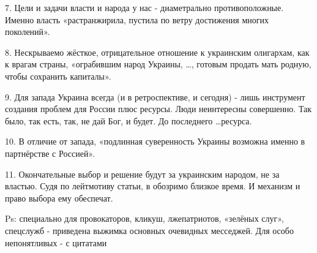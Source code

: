 7. Цели и задачи власти и народа у нас - диаметрально противоположные. Именно
власть «растранжирила, пустила по ветру достижения многих поколений».

8. Нескрываемо жёсткое, отрицательное отношение к украинским олигархам, как к
врагам страны, «ограбившим народ Украины, …, готовым продать мать родную, чтобы
сохранить капиталы». 

9. Для запада Украина всегда (и в ретроспективе, и сегодня) - лишь инструмент
создания проблем для России плюс ресурсы. Люди неинтересны совершенно. Так
было, так есть, так, не дай Бог, и будет. До последнего …ресурса. 

10. В отличие от запада, «подлинная суверенность Украины возможна именно в
партнёрстве с Россией». 

11. Окончательные выбор и решение будут за украинским народом, не за властью.
Судя по лейтмотиву статьи, в обозримо близкое время. И механизм и право выбора
ему обеспечат. 

Ps: специально для провокаторов, кликуш, лжепатриотов, «зелёных слуг»,
спецслужб - приведена выжимка основных очевидных месседжей. Для особо
непонятливых - с цитатами

